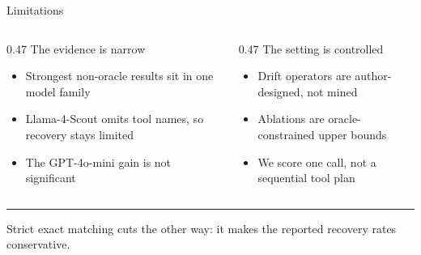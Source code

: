 \documentclass[aspectratio=169,11pt]{beamer}
\newcommand{\lbl}[1]{{\color{Mute}\fontsize{9.5}{12}\selectfont #1}\par}
\newcommand{\hairline}{{\color{Rule}\rule{\textwidth}{0.5pt}}\par}
\begin{document}
\begin{frame}{Limitations}
  \vspace{0.24cm}
  \begin{columns}[T,onlytextwidth]
    \begin{column}{0.47\textwidth}
      \lbl{The evidence is narrow}
      \vspace{0.18cm}
      {\fontsize{10}{13}\selectfont
      \begin{itemize}\setlength\itemsep{0.16cm}
        \item Strongest non-oracle results sit in one model family
        \item Llama-4-Scout omits tool names, so recovery stays limited
        \item The GPT-4o-mini gain is not significant
      \end{itemize}}
    \end{column}
    \begin{column}{0.47\textwidth}
      \lbl{The setting is controlled}
      \vspace{0.18cm}
      {\fontsize{10}{13}\selectfont
      \begin{itemize}\setlength\itemsep{0.16cm}
        \item Drift operators are author-designed, not mined
        \item Ablations are oracle-constrained upper bounds
        \item We score one call, not a sequential tool plan
      \end{itemize}}
    \end{column}
  \end{columns}

  \vspace{0.30cm}
  \hairline
  \vspace{0.11cm}
  {\fontsize{10.5}{13.5}\selectfont
    Strict exact matching cuts the other way: it makes the reported recovery rates conservative.\par}

\end{frame}
\end{document}
